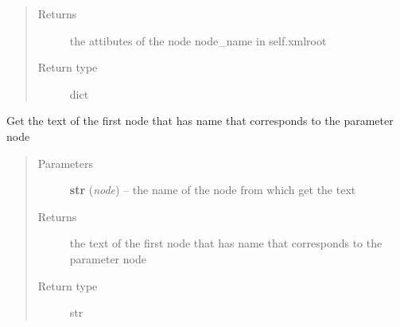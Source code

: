 \documentclass[a4paper,10pt,english]{sphinxmanual}
\begin{document}
\begin{fulllineitems}
\begin{fulllineitems}
\begin{quote}
\begin{description}
\item[{Returns}] \leavevmode
the attibutes of the node node\_name in self.xmlroot

\item[{Return type}] \leavevmode
dict

\end{description}\end{quote}

\end{fulllineitems}


\begin{fulllineitems}
\label{commands/apidoc/src:src.xmlManager.ReadXmlFile.get_node_text}
Get the text of the first node that has name 
that corresponds to the parameter node
\begin{quote}\begin{description}
\item[{Parameters}] \leavevmode
\textbf{str} (\emph{node}) -- the name of the node from which get the text

\item[{Returns}] \leavevmode
the text of the first node that has name 
that corresponds to the parameter node

\item[{Return type}] \leavevmode
str

\end{description}\end{quote}

\end{fulllineitems}


\end{fulllineitems}

\end{document}
